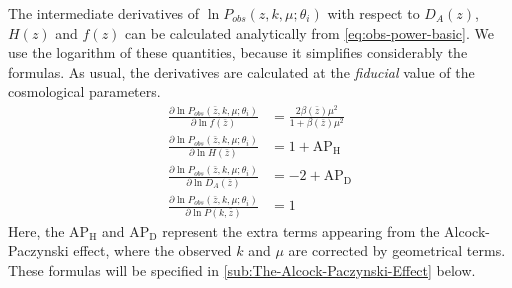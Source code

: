The intermediate derivatives of $\ln P_{obs}(z,k,\mu;\theta_{i})$
with respect to $D_{A}(z)$, $H(z)$ and $f(z)$ can be calculated analytically from
\cref{eq:obs-power-basic}. We use the logarithm of these quantities,
because it simplifies considerably the formulas. As usual, the derivatives are calculated
at the \emph{fiducial} value of the cosmological parameters.
\begin{subequations}	
	\begin{align}
	\frac{\partial\ln P_{obs}\left(\bar{z},k,\mu;\theta_{i}\right)}{\partial\ln f(\bar{z})} & =\frac{2\beta(\bar{z})\mu^{2}}{1+\beta(\bar{z})\mu^{2}}\\
	\frac{\partial\ln P_{obs}\left(\bar{z},k,\mu;\theta_{i}\right)}{\partial\ln H(\bar{z})} & =1 + \mathrm{AP}_{\mathrm{H}} \\
	\frac{\partial\ln P_{obs}\left(\bar{z},k,\mu;\theta_{i}\right)}{\partial\ln D_{A}(\bar{z})} & =-2 + \mathrm{AP}_{\mathrm{D}} \\
	\frac{\partial\ln P_{obs}\left(\bar{z},k,\mu;\theta_{i}\right)}{\partial\ln P(k,\bar{z})} & = 1
	\end{align}
	\label{eq: partial-derivs-subeqns}	
\end{subequations}
Here, the $\mathrm{AP}_{\mathrm{H}}$ and $\mathrm{AP}_{\mathrm{D}}$ represent the extra terms appearing from the Alcock-Paczynski 
effect, where the observed $k$ and $\mu$ are corrected by geometrical terms. These formulas will be specified in \cref{sub:The-Alcock-Paczynski-Effect} below.

%

